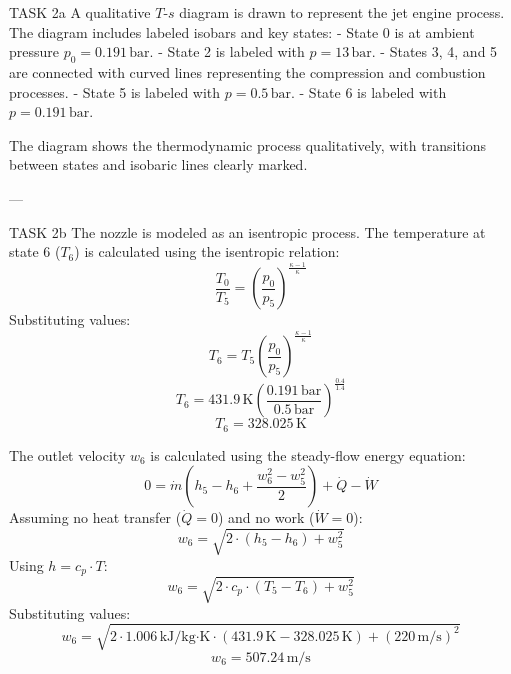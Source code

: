 TASK 2a  
A qualitative \( T \)-\( s \) diagram is drawn to represent the jet engine process. The diagram includes labeled isobars and key states:  
- State 0 is at ambient pressure \( p_0 = 0.191 \, \text{bar} \).  
- State 2 is labeled with \( p = 13 \, \text{bar} \).  
- States 3, 4, and 5 are connected with curved lines representing the compression and combustion processes.  
- State 5 is labeled with \( p = 0.5 \, \text{bar} \).  
- State 6 is labeled with \( p = 0.191 \, \text{bar} \).  

The diagram shows the thermodynamic process qualitatively, with transitions between states and isobaric lines clearly marked.

---

TASK 2b  
The nozzle is modeled as an isentropic process. The temperature at state 6 (\( T_6 \)) is calculated using the isentropic relation:  
\[
\frac{T_0}{T_5} = \left( \frac{p_0}{p_5} \right)^{\frac{\kappa-1}{\kappa}}
\]  
Substituting values:  
\[
T_6 = T_5 \left( \frac{p_0}{p_5} \right)^{\frac{\kappa-1}{\kappa}}
\]  
\[
T_6 = 431.9 \, \text{K} \left( \frac{0.191 \, \text{bar}}{0.5 \, \text{bar}} \right)^{\frac{0.4}{1.4}}
\]  
\[
T_6 = 328.025 \, \text{K}
\]  

The outlet velocity \( w_6 \) is calculated using the steady-flow energy equation:  
\[
0 = \dot{m} \left( h_5 - h_6 + \frac{w_6^2 - w_5^2}{2} \right) + \dot{Q} - \dot{W}
\]  
Assuming no heat transfer (\( \dot{Q} = 0 \)) and no work (\( \dot{W} = 0 \)):  
\[
w_6 = \sqrt{2 \cdot (h_5 - h_6) + w_5^2}
\]  
Using \( h = c_p \cdot T \):  
\[
w_6 = \sqrt{2 \cdot c_p \cdot (T_5 - T_6) + w_5^2}
\]  
Substituting values:  
\[
w_6 = \sqrt{2 \cdot 1.006 \, \text{kJ/kg·K} \cdot (431.9 \, \text{K} - 328.025 \, \text{K}) + (220 \, \text{m/s})^2}
\]  
\[
w_6 = 507.24 \, \text{m/s}
\]
